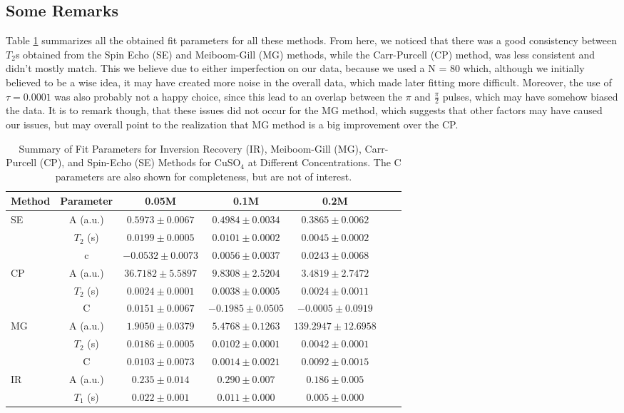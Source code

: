 \documentclass[12pt]{article}
\begin{document}
\subsection{Some Remarks}
Table \ref{tab:summary} summarizes all the obtained fit parameters for all these methods. From here, we noticed that there was a good consistency between $T_2$s obtained from the Spin Echo (SE) and Meiboom-Gill (MG) methods, while the Carr-Purcell (CP) method, was less consistent and didn't mostly match. This we believe due to either imperfection on our data, because we used a N = 80 which, although we initially believed to be a wise idea, it may have created more noise in the overall data, which made later fitting more difficult. Moreover, the use of $\tau = 0.0001$ was also probably not a happy choice, since this lead to an overlap between the $\pi$ and $\frac{\pi}{2}$ pulses, which may have somehow biased the data.
It is to remark though, that these issues did not occur for the MG method, which suggests that other factors may have caused our issues, but may overall point to the realization that MG method is a big improvement over the CP.

\begin{table}[ht]
\centering
\begin{tabular}{lcccccc}
\toprule
\textbf{Method} & \textbf{Parameter} & \textbf{0.05M} & \textbf{0.1M} & \textbf{0.2M} \\
\midrule
\multirow{3}{*}{SE} & A (a.u.) & $0.5973 \pm 0.0067$ & $0.4984 \pm 0.0034$ & $0.3865 \pm 0.0062$ \\
& $T_2$ (s) & $0.0199 \pm 0.0005$ & $0.0101 \pm 0.0002$ & $0.0045 \pm 0.0002$ \\
& c & $-0.0532 \pm 0.0073$ & $0.0056 \pm 0.0037$ & $0.0243 \pm 0.0068$ \\
\midrule
\multirow{3}{*}{CP} & A (a.u.) & $36.7182 \pm 5.5897$ & $9.8308 \pm 2.5204$ & $3.4819 \pm 2.7472$ \\
& $T_2$ (s) & $0.0024 \pm 0.0001$ & $0.0038 \pm 0.0005$ & $0.0024 \pm 0.0011$ \\
& C & $0.0151 \pm 0.0067$ & $-0.1985 \pm 0.0505$ & $-0.0005 \pm 0.0919$ \\
\midrule
\multirow{3}{*}{MG} & A (a.u.) & $1.9050 \pm 0.0379$ & $5.4768 \pm 0.1263$ & $139.2947 \pm 12.6958$ \\
& $T_2$ (s) & $0.0186 \pm 0.0005$ & $0.0102 \pm 0.0001$ & $0.0042 \pm 0.0001$ \\
& C & $0.0103 \pm 0.0073$ & $0.0014 \pm 0.0021$ & $0.0092 \pm 0.0015$ \\
\midrule
\multirow{3}{*}{IR} & A (a.u.) & $0.235 \pm 0.014$ & $0.290 \pm 0.007$ & $0.186 \pm 0.005$ \\
& $T_1$ (s) & $0.022 \pm 0.001$ & $0.011 \pm 0.000$ & $0.005 \pm 0.000$ \\
\bottomrule
\end{tabular}
\caption{Summary of Fit Parameters for Inversion Recovery (IR), Meiboom-Gill (MG), Carr-Purcell (CP), and Spin-Echo (SE) Methods for CuSO$_4$ at Different Concentrations. The C parameters are also shown for completeness, but are not of interest.}
\label{tab:summary}
\end{table}
\end{document}

